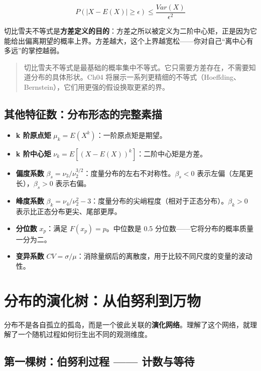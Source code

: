 \documentclass[
]{book}
\providecommand{\tightlist}{%
  \setlength{\itemsep}{0pt}\setlength{\parskip}{0pt}}
\begin{document}
\[P(|X - E(X)| \geq \epsilon) \leq \frac{Var(X)}{\epsilon^2}\]

切比雪夫不等式是\textbf{方差定义的目的}：方差之所以被定义为二阶中心矩，正是因为它能给出偏离期望的概率上界。方差越大，这个上界越宽松------你对自己``离中心有多远''的掌控越弱。

\begin{quote}
切比雪夫不等式是最基础的概率集中不等式。它只需要方差存在，不需要知道分布的具体形状。Ch04 将展示一系列更精细的不等式（Hoeffding、Bernstein），它们用更强的假设换取更紧的界。
\end{quote}

\subsection{其他特征数：分布形态的完整素描}\label{ux5176ux4ed6ux7279ux5f81ux6570ux5206ux5e03ux5f62ux6001ux7684ux5b8cux6574ux7d20ux63cf}

\begin{itemize}
\tightlist
\item
  \textbf{k 阶原点矩} \(\mu_k = E(X^k)\)：一阶原点矩是期望。
\item
  \textbf{k 阶中心矩} \(\nu_k = E[(X - E(X))^k]\)：二阶中心矩是方差。
\item
  \textbf{偏度系数} \(\beta_s = \nu_3 / \nu_2^{3/2}\)：度量分布的左右不对称性。\(\beta_s < 0\) 表示左偏（左尾更长），\(\beta_s > 0\) 表示右偏。
\item
  \textbf{峰度系数} \(\beta_k = \nu_4 / \nu_2^2 - 3\)：度量分布的尖峭程度（相对于正态分布）。\(\beta_k > 0\) 表示比正态分布更尖、尾部更厚。
\item
  \textbf{分位数} \(x_p\)：满足 \(F(x_p) = p\)。中位数是 0.5 分位数------它将分布的概率质量一分为二。
\item
  \textbf{变异系数} \(CV = \sigma / \mu\)：消除量纲后的离散度，用于比较不同尺度的变量的波动性。
\end{itemize}

\section{分布的演化树：从伯努利到万物}\label{ux5206ux5e03ux7684ux6f14ux5316ux6811ux4eceux4f2fux52aaux5229ux5230ux4e07ux7269}

分布不是各自孤立的孤岛，而是一个彼此关联的\textbf{演化网络}。理解了这个网络，就理解了一个随机过程如何衍生出不同的观测维度。

\subsection{第一棵树：伯努利过程 ------ 计数与等待}\label{ux7b2cux4e00ux68f5ux6811ux4f2fux52aaux5229ux8fc7ux7a0b-ux8ba1ux6570ux4e0eux7b49ux5f85}
\end{document}
